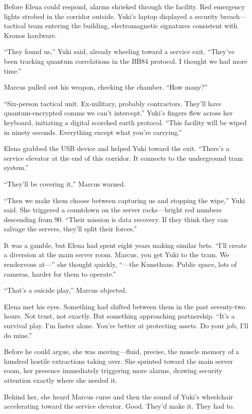 Before Elena could respond, alarms shrieked through the facility. Red emergency lights strobed in the corridor outside. Yuki's laptop displayed a security breach---tactical team entering the building, electromagnetic signatures consistent with Kronos hardware.

``They found us,'' Yuki said, already wheeling toward a service exit. ``They've been tracking quantum correlations in the BB84 protocol. I thought we had more time.''

Marcus pulled out his weapon, checking the chamber. ``How many?''

``Six-person tactical unit. Ex-military, probably contractors. They'll have quantum-encrypted comms we can't intercept.'' Yuki's fingers flew across her keyboard, initiating a digital scorched earth protocol. ``This facility will be wiped in ninety seconds. Everything except what you're carrying.''

Elena grabbed the USB device and helped Yuki toward the exit. ``There's a service elevator at the end of this corridor. It connects to the underground tram system.''

``They'll be covering it,'' Marcus warned.

``Then we make them choose between capturing us and stopping the wipe,'' Yuki said. She triggered a countdown on the server racks---bright red numbers descending from 90. ``Their mission is data recovery. If they think they can salvage the servers, they'll split their forces.''

It was a gamble, but Elena had spent eight years making similar bets. ``I'll create a diversion at the main server room. Marcus, you get Yuki to the tram. We rendezvous at---'' she thought quickly, ``---the Kunsthaus. Public space, lots of cameras, harder for them to operate.''

``That's a suicide play,'' Marcus objected.

Elena met his eyes. Something had shifted between them in the past seventy-two hours. Not trust, not exactly. But something approaching partnership. ``It's a survival play. I'm faster alone. You're better at protecting assets. Do your job, I'll do mine.''

Before he could argue, she was moving---fluid, precise, the muscle memory of a hundred hostile extractions taking over. She sprinted toward the main server room, her presence immediately triggering more alarms, drawing security attention exactly where she needed it.

Behind her, she heard Marcus curse and then the sound of Yuki's wheelchair accelerating toward the service elevator. Good. They'd make it. They had to.

